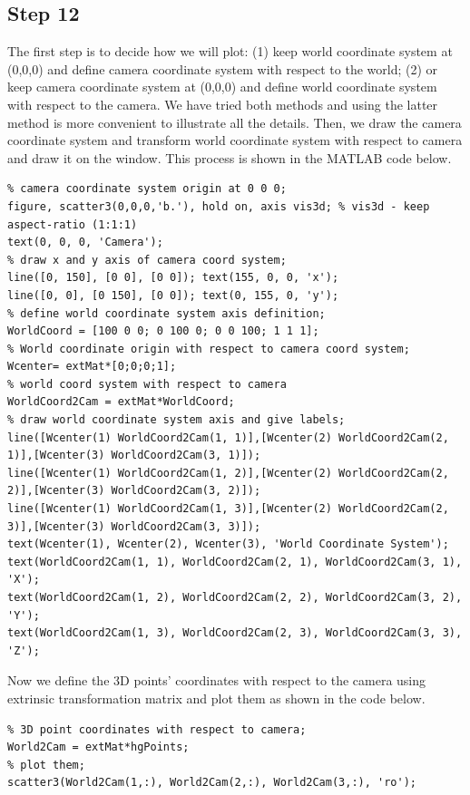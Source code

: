 \documentclass[a4paper, 10pt]{article}
\begin{document}
\subsection{Step 12}\label{step12}
The first step is to decide how we will plot: (1) keep world coordinate system at (0,0,0) and define camera coordinate system with respect to the world; (2) or keep camera coordinate system at (0,0,0) and define world coordinate system with respect to the camera. We have tried both methods and using the latter method is more convenient to illustrate all the details. Then, we draw the camera coordinate system and transform world coordinate system with respect to camera and draw it on the window. This process is shown in the MATLAB code below.
\begin{lstlisting}
% camera coordinate system origin at 0 0 0;
figure, scatter3(0,0,0,'b.'), hold on, axis vis3d; % vis3d - keep aspect-ratio (1:1:1)
text(0, 0, 0, 'Camera');
% draw x and y axis of camera coord system;
line([0, 150], [0 0], [0 0]); text(155, 0, 0, 'x');
line([0, 0], [0 150], [0 0]); text(0, 155, 0, 'y');
% define world coordinate system axis definition;
WorldCoord = [100 0 0; 0 100 0; 0 0 100; 1 1 1];
% World coordinate origin with respect to camera coord system;
Wcenter= extMat*[0;0;0;1];
% world coord system with respect to camera
WorldCoord2Cam = extMat*WorldCoord;
% draw world coordinate system axis and give labels;
line([Wcenter(1) WorldCoord2Cam(1, 1)],[Wcenter(2) WorldCoord2Cam(2, 1)],[Wcenter(3) WorldCoord2Cam(3, 1)]);
line([Wcenter(1) WorldCoord2Cam(1, 2)],[Wcenter(2) WorldCoord2Cam(2, 2)],[Wcenter(3) WorldCoord2Cam(3, 2)]);
line([Wcenter(1) WorldCoord2Cam(1, 3)],[Wcenter(2) WorldCoord2Cam(2, 3)],[Wcenter(3) WorldCoord2Cam(3, 3)]);
text(Wcenter(1), Wcenter(2), Wcenter(3), 'World Coordinate System');
text(WorldCoord2Cam(1, 1), WorldCoord2Cam(2, 1), WorldCoord2Cam(3, 1), 'X');
text(WorldCoord2Cam(1, 2), WorldCoord2Cam(2, 2), WorldCoord2Cam(3, 2), 'Y');
text(WorldCoord2Cam(1, 3), WorldCoord2Cam(2, 3), WorldCoord2Cam(3, 3), 'Z');
\end{lstlisting}

Now we define the 3D points' coordinates with respect to the camera using extrinsic transformation matrix and plot them as shown in the code below.

\begin{lstlisting}
% 3D point coordinates with respect to camera;
World2Cam = extMat*hgPoints;
% plot them;
scatter3(World2Cam(1,:), World2Cam(2,:), World2Cam(3,:), 'ro');
\end{lstlisting}
\end{document}
